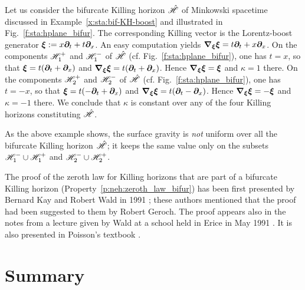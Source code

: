 \begin{example}
Let us consider the bifurcate Killing horizon $\hat{\mathscr{H}}$
of Minkowski spacetime discussed in Example~\ref{x:sta:bif-KH-boost} and illustrated
in Fig.~\ref{f:sta:hplane_bifur}. The corresponding Killing vector is
the Lorentz-boost generator $\bm{\xi} := x \bm{\partial}_t + t \bm{\partial}_x$. An easy computation
yields $\bm{\nabla}_{\bm{\xi}} \bm{\xi} = t \bm{\partial}_t + x \bm{\partial}_x$. On the components
$\mathscr{H}_1^+$ and $\mathscr{H}_1^-$ of $\hat{\mathscr{H}}$ (cf. Fig.~\ref{f:sta:hplane_bifur}),
one has $t=x$, so that $\bm{\xi} =  t (\bm{\partial}_t + \bm{\partial}_x)$ and
$\bm{\nabla}_{\bm{\xi}} \bm{\xi} = t (\bm{\partial}_t + \bm{\partial}_x)$. Hence $\bm{\nabla}_{\bm{\xi}} \bm{\xi} = \bm{\xi}$
and $\kappa = 1$ there.
On the components $\mathscr{H}_2^+$ and $\mathscr{H}_2^-$ of $\hat{\mathscr{H}}$ (cf. Fig.~\ref{f:sta:hplane_bifur}),
one has $t=-x$, so that $\bm{\xi} =  t (-\bm{\partial}_t + \bm{\partial}_x)$
and
$\bm{\nabla}_{\bm{\xi}} \bm{\xi} = t (\bm{\partial}_t - \bm{\partial}_x)$.
Hence  $\bm{\nabla}_{\bm{\xi}} \bm{\xi} = - \bm{\xi}$ and $\kappa = -1$ there.
We conclude that $\kappa$ is constant over any of the four Killing horizons
constituting $\hat{\mathscr{H}}$.
\end{example}

\begin{remark}
As the above example shows, the surface gravity is \emph{not} uniform over
all the bifurcate Killing horizon $\hat{\mathscr{H}}$; it keeps the same value only on the subsets $\mathscr{H}_1^-\cup \mathscr{H}_1^+$
and $\mathscr{H}_2^-\cup \mathscr{H}_2^+$.
\end{remark}


\begin{hist}
The proof of the zeroth law for Killing horizons that are part of a bifurcate Killing horizon (Property~\ref{p:neh:zeroth_law_bifur}) has been first presented by Bernard Kay
and Robert Wald in 1991 \cite{KayW91}; these authors mentioned that the proof had been suggested
to them by Robert Geroch. The proof appears also in the notes from a lecture
given by Wald at a school held in Erice in May 1991 \cite{Wald92}. It is also presented in
Poisson's textbook \cite{Poiss04}.
\end{hist}


\section{Summary}

